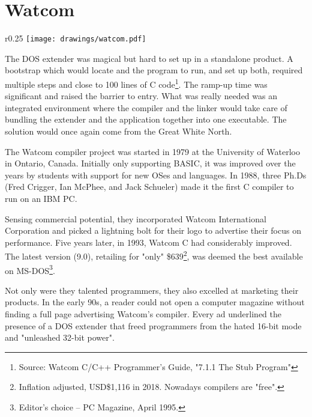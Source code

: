 \section{Watcom}

\begin{wrapfigure}[9]{r}{0.25\textwidth}
\centering
\texttt{[image: drawings/watcom.pdf]}
\end{wrapfigure}


The DOS extender was magical but hard to set up in a standalone product. A bootstrap which would locate  and the program to run, and set up both, required multiple steps and close to 100 lines of C code\footnote{Source: Watcom C/C++ Programmer's Guide, "7.1.1 The Stub Program"}. The ramp-up time was significant and raised the barrier to entry. What was really needed was an integrated environment where the compiler and the linker would take care of bundling the extender and the application together into one executable. The solution would once again come from the Great White North.\\ 
\par

The Watcom compiler project was started in 1979 at the University of Waterloo in Ontario, Canada. Initially only supporting BASIC, it was improved over the years by students with support for new OSes and languages. In 1988, three Ph.Ds (Fred Crigger, Ian McPhee, and Jack Schueler) made it the first C compiler to run on an IBM PC.\\
\par
Sensing commercial potential, they incorporated Watcom International Corporation and picked a lightning bolt for their logo to advertise their focus on performance. Five years later, in 1993, Watcom C had considerably improved. The latest version (9.0), retailing for "only" \$639\footnote{Inflation adjusted, USD\$1,116 in 2018. Nowadays compilers are "free".}, was deemed the best available on MS-DOS\footnote{Editor's choice -- PC Magazine, April 1995.}. \\
\par
Not only were they talented programmers, they also excelled at marketing their products. In the early 90s, a reader could not open a computer magazine without finding a full page advertising Watcom's compiler. Every ad underlined the presence of a DOS extender that freed programmers from the hated 16-bit mode and "unleashed 32-bit power".
\par
\label{watcomad}



